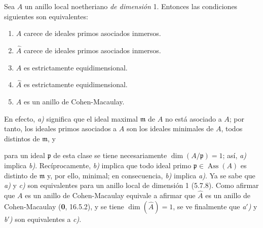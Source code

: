 \begin{example}[7.2.1.1]
\label{IV.2.s7.2.1.1-fr}
Sea $A$ un anillo local noetheriano \emph{de dimensión} 1. Entonces
las condiciones siguientes son equivalentes:
\begin{enumerate}
\item[\emph{a)}] $A$ carece de ideales primos asociados inmersos.
\item[\emph{a$'$)}] $\widehat A$ carece de ideales primos asociados inmersos.
\item[\emph{b)}] $A$ es estrictamente equidimensional.
\item[\emph{b$'$)}] $\widehat A$ es estrictamente equidimensional.
\item[\emph{c)}] $A$ es un anillo de Cohen-Macaulay.
\end{enumerate}
\end{example}

En efecto, \emph{a)} significa que el ideal maximal $\mathfrak m$ de $A$ no
está asociado a $A$; por tanto, los ideales primos asociados a $A$ son
los ideales minimales de $A$, todos distintos de $\mathfrak m$, y


para un ideal $\mathfrak p$ de esta clase se tiene necesariamente
$\dim(A/\mathfrak p)=1$; así, \emph{a)} implica \emph{b)}. Recíprocamente, \emph{b)}
implica que todo ideal primo $\mathfrak p\in\operatorname{Ass}(A)$ es
distinto de $\mathfrak m$ y, por ello, minimal; en consecuencia, \emph{b)}
implica \emph{a)}. Ya se sabe que \emph{a)} y \emph{c)} son equivalentes para un anillo local
de dimensión 1 (5.7.8). Como afirmar que $A$ es un anillo de
Cohen-Macaulay equivale a afirmar que $\widehat A$ es un anillo de Cohen-Macaulay
(\textbf{0}, 16.5.2), y se tiene $\dim(\widehat A)=1$, se ve finalmente que
\emph{a$'$)} y \emph{b$'$)} son equivalentes a \emph{c)}.

